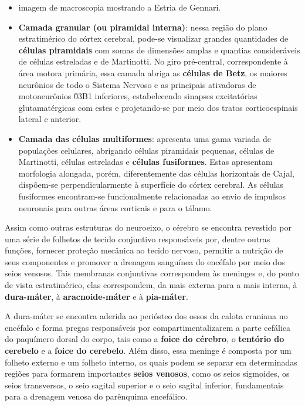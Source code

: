 \documentclass[
]{book}
\theoremstyle{definition}
\theoremstyle{definition}
\theoremstyle{definition}
\theoremstyle{definition}
\theoremstyle{remark}
\begin{document}
\begin{itemize}
\item
  imagem de macroscopia mostrando a Estria de Gennari.
\item
  \textbf{Camada granular (ou piramidal interna)}: nessa região do plano estratimérico do córtex cerebral, pode-se visualizar grandes quantidades de \textbf{células piramidais} com somas de dimensões amplas e quantias consideráveis de células estreladas e de Martinotti. No giro pré-central, correspondente à área motora primária, essa camada abriga as \textbf{células de Betz}, os maiores neurônios de todo o Sistema Nervoso e as principais ativadoras de motoneurônios \u03B1 inferiores, estabelecendo sinapses excitatórias glutamatérgicas com estes e projetando-se por meio dos tratos corticoespinais lateral e anterior.
\item
  \textbf{Camada das células multiformes}: apresenta uma gama variada de populações celulares, abrigando células piramidais pequenas, células de Martinotti, células estreladas e \textbf{células fusiformes}. Estas apresentam morfologia alongada, porém, diferentemente das células horizontais de Cajal, dispõem-se perpendicularmente à superfície do córtex cerebral. As células fusiformes encontram-se funcionalmente relacionadas ao envio de impulsos neuronais para outras áreas corticais e para o tálamo.
\end{itemize}

Assim como outras estruturas do neuroeixo, o cérebro se encontra revestido por uma série de folhetos de tecido conjuntivo responsáveis por, dentre outras funções, fornecer proteção mecânica ao tecido nervoso, permitir a nutrição de seus componentes e promover a drenagem sanguínea do encéfalo por meio dos seios venosos. Tais membranas conjuntivas correspondem às meninges e, do ponto de vista estratimérico, elas correspondem, da mais externa para a mais interna, à \textbf{dura-máter}, à \textbf{aracnoide-máter} e à \textbf{pia-máter}.

A dura-máter se encontra aderida ao periósteo dos ossos da calota craniana no encéfalo e forma pregas responsáveis por compartimentalizarem a parte cefálica do paquímero dorsal do corpo, tais como a \textbf{foice do cérebro}, o \textbf{tentório do cerebelo} e a \textbf{foice do cerebelo}. Além disso, essa meninge é composta por um folheto externo e um folheto interno, os quais podem se separar em determinadas regiões para formarem importantes \textbf{seios venosos}, como os seios sigmoides, os seios transversos, o seio sagital superior e o seio sagital inferior, fundamentais para a drenagem venosa do parênquima encefálico.
\end{document}
